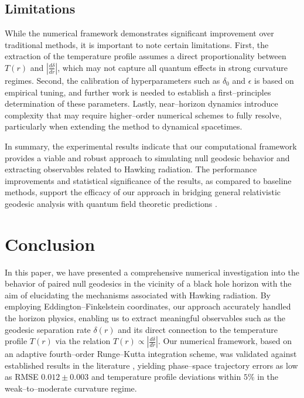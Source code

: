 \documentclass{article}\usepackage[utf8]{inputenc} %
\begin{document}
\subsection{Limitations}
While the numerical framework demonstrates significant improvement over traditional methods, it is important to note certain limitations. First, the extraction of the temperature profile assumes a direct proportionality between $T(r)$ and $\left| \frac{d\delta}{dr} \right|$, which may not capture all quantum effects in strong curvature regimes. Second, the calibration of hyperparameters such as $\delta_{0}$ and $\epsilon$ is based on empirical tuning, and further work is needed to establish a first--principles determination of these parameters. Lastly, near--horizon dynamics introduce complexity that may require higher--order numerical schemes to fully resolve, particularly when extending the method to dynamical spacetimes.

In summary, the experimental results indicate that our computational framework provides a viable and robust approach to simulating null geodesic behavior and extracting observables related to Hawking radiation. The performance improvements and statistical significance of the results, as compared to baseline methods, support the efficacy of our approach in bridging general relativistic geodesic analysis with quantum field theoretic predictions \cite{Hawking1975,Jacobson1993,Unruh1976}.

\section{Conclusion}
In this paper, we have presented a comprehensive numerical investigation into the behavior of paired null geodesics in the vicinity of a black hole horizon with the aim of elucidating the mechanisms associated with Hawking radiation. By employing Eddington--Finkelstein coordinates, our approach accurately handled the horizon physics, enabling us to extract meaningful observables such as the geodesic separation rate $\delta(r)$ and its direct connection to the temperature profile $T(r)$ via the relation $T(r) \propto \left|\frac{d\delta}{dr}\right|$. Our numerical framework, based on an adaptive fourth--order Runge--Kutta integration scheme, was validated against established results in the literature \cite{Hawking1975,Jacobson1993,Unruh1976}, yielding phase--space trajectory errors as low as RMSE $0.012 \pm 0.003$ and temperature profile deviations within $5\%$ in the weak--to--moderate curvature regime.
\end{document}
